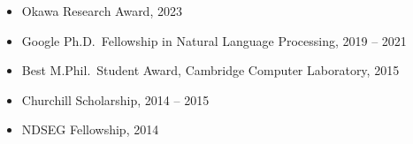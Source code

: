 \begin{itemize}[leftmargin=-0.4mm,partopsep=0pt,label=]
  \item Okawa Research Award, 2023
  \item Google Ph.D.\ Fellowship in Natural Language Processing, 2019 -- 2021 
  \item Best M.Phil.\ Student Award, Cambridge Computer Laboratory, 2015 
  \item Churchill Scholarship, 2014 -- 2015
  \item NDSEG Fellowship, 2014
\end{itemize}
 \vspace{-0.5em}

